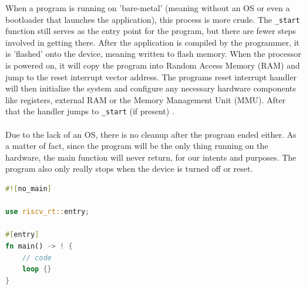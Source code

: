 When a program is running on 'bare-metal' (meaning without an OS or even a bootloader that launches the  application), this process is more crude.
The \lstinline{_start} function still serves as the entry point for the program, but there are fewer steps involved in getting there.
After the application is compiled by the programmer, it is 'flashed' onto the device, meaning written to flash memory.
When the processor is powered on, it will copy the program into Random Access Memory (RAM) and jump to the reset interrupt vector address.
The programs reset interrupt handler will then initialize the system and configure any necessary hardware components
like registers, external RAM or the Memory Management Unit (MMU).
After that the handler jumps to \lstinline{_start} (if present) \cite{before_main}.\\\\
Due to the lack of an OS, there is no cleanup after the program ended either.
As a matter of fact, since the program will be the only thing running on the hardware,
the main function will never return, for our intents and purposes.
The program also only really stops when the device is turned off or reset.

\begin{lstlisting}[style=colorEX,language=Rust,caption={Example main function for the pulp-platform},label={code:embedded_main}]
#![no_main]

use riscv_rt::entry;

#[entry]
fn main() -> ! {
    // code
    loop {}
}
\end{lstlisting}

